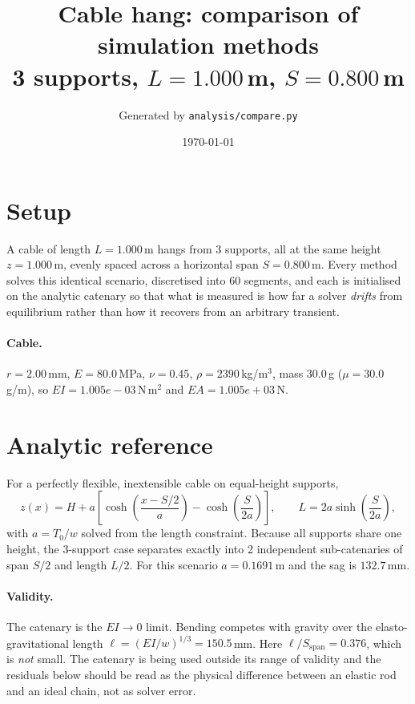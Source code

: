 \documentclass[11pt,a4paper]{article}
\title{Cable hang: comparison of simulation methods\\
\large 3 supports, $L = 1.000$\,m,
$S = 0.800$\,m}
\author{Generated by \texttt{analysis/compare.py}}
\date{\today}
\begin{document}
\maketitle

\section{Setup}

A cable of length $L = 1.000$\,m hangs from
3 supports, all at the same height
$z = 1.000$\,m, evenly spaced across a horizontal span
$S = 0.800$\,m. Every method solves this identical scenario,
discretised into 60 segments, and each is initialised on
the analytic catenary so that what is measured is how far a solver
\emph{drifts} from equilibrium rather than how it recovers from an arbitrary
transient.

\paragraph{Cable.} $r = 2.00$\,mm,
$E = 80.0$\,MPa, $\nu = 0.45$,
$\rho = 2390$\,kg/m$^3$, mass $30.0$\,g
($\mu = 30.0$\,g/m), so
$EI = 1.005e-03$\,N\,m$^2$ and
$EA = 1.005e+03$\,N.

\section{Analytic reference}

For a perfectly flexible, inextensible cable on equal-height supports,
\begin{equation}
  z(x) = H + a\left[\cosh\!\left(\frac{x - S/2}{a}\right)
                    - \cosh\!\left(\frac{S}{2a}\right)\right],
  \qquad L = 2a\sinh\!\left(\frac{S}{2a}\right),
\end{equation}
with $a = T_0/w$ solved from the length constraint. Because all supports share
one height, the 3-support case separates exactly into
2 independent sub-catenaries of span
$S/2$ and length $L/2$.
For this scenario $a = 0.1691$\,m and the sag is
$132.7$\,mm.

\paragraph{Validity.} The catenary is the $EI \to 0$ limit. Bending competes
with gravity over the elasto-gravitational length
$\ell = (EI/w)^{1/3} = 150.5$\,mm. Here $\ell/S_{\mathrm{span}} = 0.376$, which is \emph{not} small. The catenary is being used outside its range of validity and the residuals below should be read as the physical difference between an elastic rod and an ideal chain, not as solver error.
\end{document}
